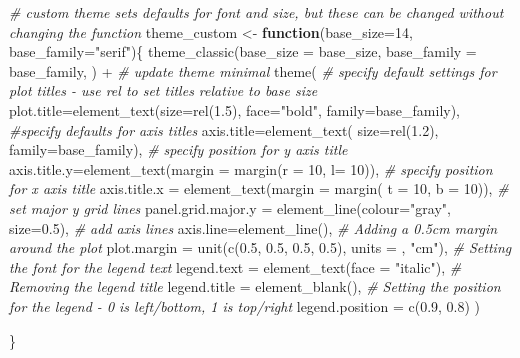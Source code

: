 \documentclass[
]{book}
\newenvironment{Shaded}{\begin{snugshade}}{\end{snugshade}}
\newcommand{\AttributeTok}[1]{\textcolor[rgb]{0.77,0.63,0.00}{#1}}
\newcommand{\CommentTok}[1]{\textcolor[rgb]{0.56,0.35,0.01}{\textit{#1}}}
\newcommand{\ControlFlowTok}[1]{\textcolor[rgb]{0.13,0.29,0.53}{\textbf{#1}}}
\newcommand{\DecValTok}[1]{\textcolor[rgb]{0.00,0.00,0.81}{#1}}
\newcommand{\FloatTok}[1]{\textcolor[rgb]{0.00,0.00,0.81}{#1}}
\newcommand{\FunctionTok}[1]{\textcolor[rgb]{0.00,0.00,0.00}{#1}}
\newcommand{\NormalTok}[1]{#1}
\newcommand{\OtherTok}[1]{\textcolor[rgb]{0.56,0.35,0.01}{#1}}
\newcommand{\SpecialCharTok}[1]{\textcolor[rgb]{0.00,0.00,0.00}{#1}}
\newcommand{\StringTok}[1]{\textcolor[rgb]{0.31,0.60,0.02}{#1}}
\begin{document}
\begin{Shaded}
\begin{Highlighting}[]
\CommentTok{\# custom theme sets defaults for font and size, but these can be changed without changing the function}
\NormalTok{theme\_custom }\OtherTok{\textless{}{-}} \ControlFlowTok{function}\NormalTok{(}\AttributeTok{base\_size=}\DecValTok{14}\NormalTok{, }\AttributeTok{base\_family=}\StringTok{"serif"}\NormalTok{)\{}
  \FunctionTok{theme\_classic}\NormalTok{(}\AttributeTok{base\_size =}\NormalTok{ base\_size, }
                \AttributeTok{base\_family =}\NormalTok{ base\_family,}
\NormalTok{                ) }\SpecialCharTok{+}
\CommentTok{\# update theme minimal }
\FunctionTok{theme}\NormalTok{(}
  \CommentTok{\# specify default settings for plot titles {-} use rel to set titles relative to base size}
  \AttributeTok{plot.title=}\FunctionTok{element\_text}\NormalTok{(}\AttributeTok{size=}\FunctionTok{rel}\NormalTok{(}\FloatTok{1.5}\NormalTok{),}
      \AttributeTok{face=}\StringTok{"bold"}\NormalTok{,}
      \AttributeTok{family=}\NormalTok{base\_family),}
  \CommentTok{\#specify defaults for axis titles}
  \AttributeTok{axis.title=}\FunctionTok{element\_text}\NormalTok{(}
    \AttributeTok{size=}\FunctionTok{rel}\NormalTok{(}\FloatTok{1.2}\NormalTok{),}
    \AttributeTok{family=}\NormalTok{base\_family),}
  \CommentTok{\# specify position for y axis title}
  \AttributeTok{axis.title.y=}\FunctionTok{element\_text}\NormalTok{(}\AttributeTok{margin =} \FunctionTok{margin}\NormalTok{(}\AttributeTok{r =} \DecValTok{10}\NormalTok{, }\AttributeTok{l=} \DecValTok{10}\NormalTok{)),}
  \CommentTok{\# specify position for x axis title}
  \AttributeTok{axis.title.x =} \FunctionTok{element\_text}\NormalTok{(}\AttributeTok{margin =} \FunctionTok{margin}\NormalTok{( }\AttributeTok{t =} \DecValTok{10}\NormalTok{, }\AttributeTok{b =} \DecValTok{10}\NormalTok{)),}
  \CommentTok{\# set major y grid lines}
  \AttributeTok{panel.grid.major.y =} \FunctionTok{element\_line}\NormalTok{(}\AttributeTok{colour=}\StringTok{"gray"}\NormalTok{, }\AttributeTok{size=}\FloatTok{0.5}\NormalTok{),}
  \CommentTok{\# add axis lines}
  \AttributeTok{axis.line=}\FunctionTok{element\_line}\NormalTok{(),}
   \CommentTok{\# Adding a 0.5cm margin around the plot}
  \AttributeTok{plot.margin =} \FunctionTok{unit}\NormalTok{(}\FunctionTok{c}\NormalTok{(}\FloatTok{0.5}\NormalTok{, }\FloatTok{0.5}\NormalTok{, }\FloatTok{0.5}\NormalTok{, }\FloatTok{0.5}\NormalTok{), }\AttributeTok{units =}\NormalTok{ , }\StringTok{"cm"}\NormalTok{),    }
   \CommentTok{\# Setting the font for the legend text}
  \AttributeTok{legend.text =} \FunctionTok{element\_text}\NormalTok{(}\AttributeTok{face =} \StringTok{"italic"}\NormalTok{),   }
    \CommentTok{\# Removing the legend title}
          \AttributeTok{legend.title =} \FunctionTok{element\_blank}\NormalTok{(),    }
   \CommentTok{\# Setting the position for the legend {-} 0 is left/bottom, 1 is top/right}
          \AttributeTok{legend.position =} \FunctionTok{c}\NormalTok{(}\FloatTok{0.9}\NormalTok{, }\FloatTok{0.8}\NormalTok{)             }
\NormalTok{)}
  
\NormalTok{\}}
\end{Highlighting}
\end{Shaded}
\end{document}
